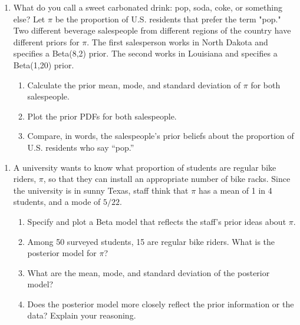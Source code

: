 \documentclass[aspectratio=43,11pt]{beamer}
\begin{document}
{  %
  \begin{frame}{}
    \small
    \begin{enumerate}
      \item[9.] What do you call a sweet carbonated drink: pop, soda, coke, or something else?
      Let $\pi$ be the proportion of U.S. residents that prefer the term "pop." Two different beverage salespeople from different regions of the country have different priors for $\pi$.
      The first salesperson works in North Dakota and specifies a Beta(8,2) prior. The second works in Louisiana and specifies a Beta(1,20) prior.
      \begin{enumerate}
        \item[a.] Calculate the prior mean, mode, and standard deviation of $\pi$ for both salespeople.
        \item[b.] Plot the prior PDFs for both salespeople.
        \item[c.] Compare, in words, the salespeople's prior beliefs about the proportion of U.S. residents who say ``pop.''
      \end{enumerate}
    \end{enumerate}
  \end{frame}

  \begin{frame}{}
    \small
    \begin{enumerate}
      \item[10.] A university wants to know what proportion of students are regular bike riders, $\pi$, so that they can install an appropriate number of bike racks.
      Since the university is in sunny Texas, staff think that $\pi$ has a mean of 1 in 4 students, and a mode of $5/22$.
      \begin{enumerate}
        \item[a.] Specify and plot a Beta model that reflects the staff's prior ideas about $\pi$.
        \item[b.] Among 50 surveyed students, 15 are regular bike riders. What is the posterior model for $\pi$?
        \item[c.] What are the mean, mode, and standard deviation of the posterior model?
        \item[d.] Does the posterior model more closely reflect the prior information or the data? Explain your reasoning.
      \end{enumerate}
    \end{enumerate}
  \end{frame}
}
\end{document}
